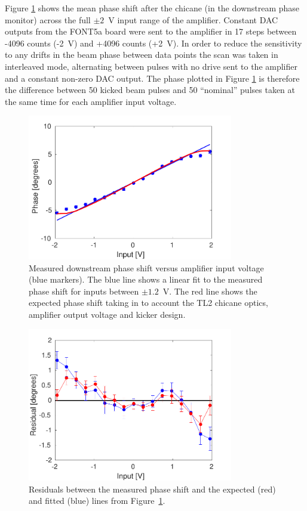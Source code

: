 Figure \ref{f:phaseVsAmpVoltage} shows the mean phase shift after the chicane (in the downstream phase monitor) across the full \(\pm2\)~V input range of the amplifier. Constant DAC outputs from the FONT5a board were sent to the amplifier in 17 steps between -4096 counts (-2~V) and +4096 counts (+2~V). In order to reduce the sensitivity to any drifts in the beam phase between data points the scan was taken in interleaved mode, alternating between pulses with no drive sent to the amplifier and a constant non-zero DAC output. The phase plotted in Figure \ref{f:phaseVsAmpVoltage} is therefore the difference between 50 kicked beam pulses and 50 ``nominal'' pulses taken at the same time for each amplifier input voltage. 

\begin{figure}
  \centering
  \includegraphics[width=0.8\textwidth]{Figures/commissioning/phaseVsAmpVoltage}
  \caption{Measured downstream phase shift versus amplifier input voltage (blue markers). The blue line shows a linear fit to the measured phase shift for inputs between \(\pm1.2\)~V. The red line shows the expected phase shift taking in to account the TL2 chicane optics, amplifier output voltage and kicker design.}
  \label{f:phaseVsAmpVoltage}
\end{figure}

\begin{figure}
  \centering
  \includegraphics[width=0.8\textwidth]{Figures/commissioning/phaseVsAmpVoltage_residuals}
  \caption{Residuals between the measured phase shift and the expected (red) and fitted (blue) lines from Figure~\ref{f:phaseVsAmpVoltage}.}
  \label{f:phaseVsAmp_resid}
\end{figure}

